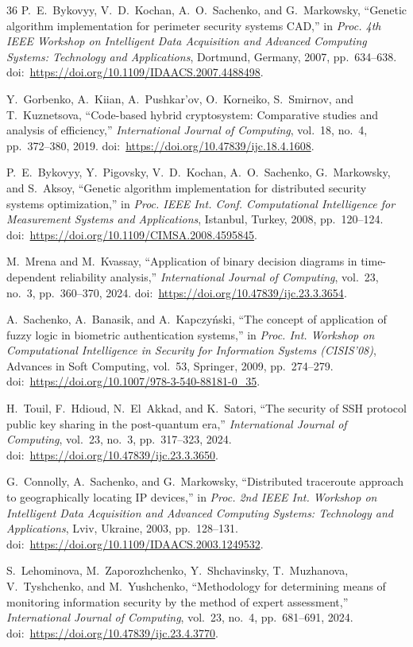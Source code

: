 \documentclass[conference]{IEEEtran}
\begin{document}
\begin{thebibliography}{36}
P.~E.~Bykovyy, V.~D.~Kochan, A.~O.~Sachenko, and G.~Markowsky, ``Genetic algorithm implementation for perimeter security systems CAD,'' in \emph{Proc. 4th IEEE Workshop on Intelligent Data Acquisition and Advanced Computing Systems: Technology and Applications}, Dortmund, Germany, 2007, pp.~634--638. doi:~\url{https://doi.org/10.1109/IDAACS.2007.4488498}.

Y.~Gorbenko, A.~Kiian, A.~Pushkar'ov, O.~Korneiko, S.~Smirnov, and T.~Kuznetsova, ``Code-based hybrid cryptosystem: Comparative studies and analysis of efficiency,'' \emph{International Journal of Computing}, vol.~18, no.~4, pp.~372--380, 2019. doi:~\url{https://doi.org/10.47839/ijc.18.4.1608}.

P.~E.~Bykovyy, Y.~Pigovsky, V.~D.~Kochan, A.~O.~Sachenko, G.~Markowsky, and S.~Aksoy, ``Genetic algorithm implementation for distributed security systems optimization,'' in \emph{Proc. IEEE Int. Conf. Computational Intelligence for Measurement Systems and Applications}, Istanbul, Turkey, 2008, pp.~120--124. doi:~\url{https://doi.org/10.1109/CIMSA.2008.4595845}.

M.~Mrena and M.~Kvassay, ``Application of binary decision diagrams in time-dependent reliability analysis,'' \emph{International Journal of Computing}, vol.~23, no.~3, pp.~360--370, 2024. doi:~\url{https://doi.org/10.47839/ijc.23.3.3654}.

A.~Sachenko, A.~Banasik, and A.~Kapczy\'nski, ``The concept of application of fuzzy logic in biometric authentication systems,'' in \emph{Proc. Int. Workshop on Computational Intelligence in Security for Information Systems (CISIS'08)}, Advances in Soft Computing, vol.~53, Springer, 2009, pp.~274--279. doi:~\url{https://doi.org/10.1007/978-3-540-88181-0_35}.

H.~Touil, F.~Hdioud, N.~El~Akkad, and K.~Satori, ``The security of SSH protocol public key sharing in the post-quantum era,'' \emph{International Journal of Computing}, vol.~23, no.~3, pp.~317--323, 2024. doi:~\url{https://doi.org/10.47839/ijc.23.3.3650}.

G.~Connolly, A.~Sachenko, and G.~Markowsky, ``Distributed traceroute approach to geographically locating IP devices,'' in \emph{Proc. 2nd IEEE Int. Workshop on Intelligent Data Acquisition and Advanced Computing Systems: Technology and Applications}, Lviv, Ukraine, 2003, pp.~128--131. doi:~\url{https://doi.org/10.1109/IDAACS.2003.1249532}.

S.~Lehominova, M.~Zaporozhchenko, Y.~Shchavinsky, T.~Muzhanova, V.~Tyshchenko, and M.~Yushchenko, ``Methodology for determining means of monitoring information security by the method of expert assessment,'' \emph{International Journal of Computing}, vol.~23, no.~4, pp.~681--691, 2024. doi:~\url{https://doi.org/10.47839/ijc.23.4.3770}.

\end{thebibliography}
\end{document}
